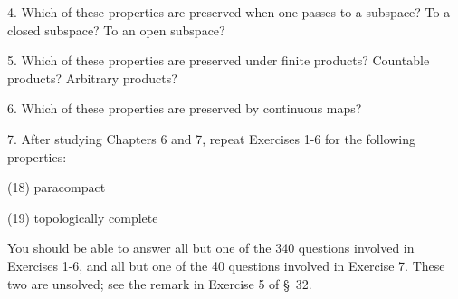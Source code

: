 4. Which of these properties are preserved when one passes to a subspace? To a closed subspace? To an open subspace?

5. Which of these properties are preserved under finite products? Countable products? Arbitrary products?

6. Which of these properties are preserved by continuous maps?

7. After studying Chapters 6 and 7, repeat Exercises 1-6 for the following properties:

(18) paracompact

(19) topologically complete

You should be able to answer all but one of the 340 questions involved in Exercises 1-6, and all but one of the 40 questions involved in Exercise 7. These two are unsolved; see the remark in Exercise 5 of \S\ 32.